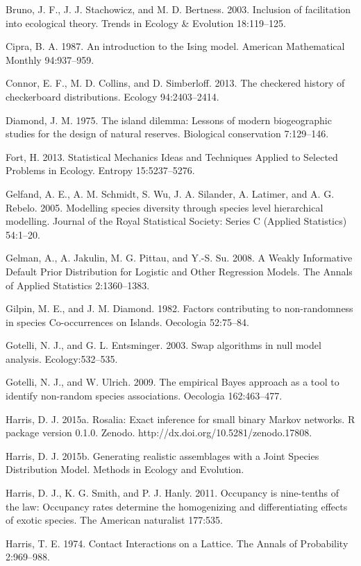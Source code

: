 \documentclass[12pt,]{article}
\begin{document}
\begin{spacing}{1.9}
\begin{flushleft}
Bruno, J. F., J. J. Stachowicz, and M. D. Bertness. 2003. Inclusion of
facilitation into ecological theory. Trends in Ecology \& Evolution
18:119--125.

Cipra, B. A. 1987. An introduction to the Ising model. American
Mathematical Monthly 94:937--959.

Connor, E. F., M. D. Collins, and D. Simberloff. 2013. The checkered
history of checkerboard distributions. Ecology 94:2403--2414.

Diamond, J. M. 1975. The island dilemma: Lessons of modern biogeographic
studies for the design of natural reserves. Biological conservation
7:129--146.

Fort, H. 2013. Statistical Mechanics Ideas and Techniques Applied to
Selected Problems in Ecology. Entropy 15:5237--5276.

Gelfand, A. E., A. M. Schmidt, S. Wu, J. A. Silander, A. Latimer, and A.
G. Rebelo. 2005. Modelling species diversity through species level
hierarchical modelling. Journal of the Royal Statistical Society: Series
C (Applied Statistics) 54:1--20.

Gelman, A., A. Jakulin, M. G. Pittau, and Y.-S. Su. 2008. A Weakly
Informative Default Prior Distribution for Logistic and Other Regression
Models. The Annals of Applied Statistics 2:1360--1383.

Gilpin, M. E., and J. M. Diamond. 1982. Factors contributing to
non-randomness in species Co-occurrences on Islands. Oecologia
52:75--84.

Gotelli, N. J., and G. L. Entsminger. 2003. Swap algorithms in null
model analysis. Ecology:532--535.

Gotelli, N. J., and W. Ulrich. 2009. The empirical Bayes approach as a
tool to identify non-random species associations. Oecologia
162:463--477.

Harris, D. J. 2015a. Rosalia: Exact inference for small binary Markov
networks. R package version 0.1.0. Zenodo.
http://dx.doi.org/10.5281/zenodo.17808.

Harris, D. J. 2015b. Generating realistic assemblages with a Joint
Species Distribution Model. Methods in Ecology and Evolution.

Harris, D. J., K. G. Smith, and P. J. Hanly. 2011. Occupancy is
nine-tenths of the law: Occupancy rates determine the homogenizing and
differentiating effects of exotic species. The American naturalist
177:535.

Harris, T. E. 1974. Contact Interactions on a Lattice. The Annals of
Probability 2:969--988.


\end{flushleft}
\end{spacing}
\end{document}

